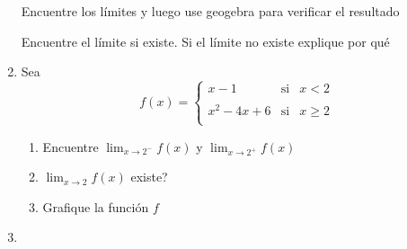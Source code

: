\documentclass[10pt,twoside]{article}
\begin{document}
\begin{enumerate}
Encuentre los l\'{i}mites y luego use geogebra para verificar el resultado
Encuentre el límite si existe. Si el límite no existe explique por qué
\item Sea 
\[f(x)=\left\{ \begin{array}{lcl}
x-1 & \mbox{si} & x<2\\
& &\\
x^{2}-4x+6 & \mbox{si} & x \geq 2\\
\end{array}
\right. \]
\begin{enumerate}
\item Encuentre $\displaystyle{\lim_{x\rightarrow 2^{-}}}f(x)$ y $\displaystyle{\lim_{x\rightarrow 2^{+}}}f(x)$
\item $\displaystyle{\lim_{x\rightarrow 2}}f(x)$ existe?
\item Grafique la función $f$
\end{enumerate}
\item 
\end{enumerate}
\end{document}
